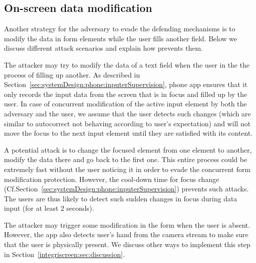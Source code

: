 \subsection{On-screen data modification}
Another strategy for the adversary to evade the defending mechanisms is to modify the data in form elements while the user fills another field. Below we discuss different attack scenarios and explain how \sysname prevents them.


 The attacker may try to modify the data of a text field when the user in the the process of filling up another. As described in Section~\ref{sec:systemDesign:phone:inputerSupervision}, \sysname phone app ensures that it only records the input data from the screen that is in focus and filled up by the user. In case of concurrent modification of the active input element by both the adversary and the user, we assume that the user detects such changes (which are similar to autocorrect not behaving according to user's expectation) and will not move the focus to the next input element until they are satisfied with its content.


 A potential attack is to change the focused element from one element to another, modify the data there and go back to the first one. This entire process could be extremely fast without the user noticing it in order to evade the concurrent form modification protection. However, the cool-down time for focus change (Cf.Section~\ref{sec:systemDesign:phone:inputerSupervision}) prevents such attacks. The users are thus likely to detect such sudden changes in focus during data input (for at least 2 seconds).

 The attacker may trigger some modification in the form when the user is absent. However, the \sysname app also detects user's hand from the camera stream to make sure that the user is physically present. We discuss other ways to implement this step in Section~\ref{integriscreen:sec:discussion}.